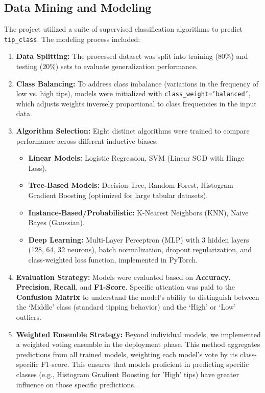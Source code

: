 \documentclass[11pt]{article}
\begin{document}
\subsection{Data Mining and Modeling}
The project utilized a suite of supervised classification algorithms to predict \texttt{tip\_class}. The modeling process included:

\begin{enumerate}
    \item \textbf{Data Splitting:} The processed dataset was split into training (80\%) and testing (20\%) sets to evaluate generalization performance.

    \item \textbf{Class Balancing:} To address class imbalance (variations in the frequency of low vs. high tips), models were initialized with \texttt{class\_weight='balanced'}, which adjusts weights inversely proportional to class frequencies in the input data.

    \item \textbf{Algorithm Selection:} Eight distinct algorithms were trained to compare performance across different inductive biases:
    \begin{itemize}
        \item \textbf{Linear Models:} Logistic Regression, SVM (Linear SGD with Hinge Loss).
        \item \textbf{Tree-Based Models:} Decision Tree, Random Forest, Histogram Gradient Boosting (optimized for large tabular datasets).
        \item \textbf{Instance-Based/Probabilistic:} K-Nearest Neighbors (KNN), Naive Bayes (Gaussian).
        \item \textbf{Deep Learning:} Multi-Layer Perceptron (MLP) with 3 hidden layers (128, 64, 32 neurons), batch normalization, dropout regularization, and class-weighted loss function, implemented in PyTorch.
    \end{itemize}

    \item \textbf{Evaluation Strategy:} Models were evaluated based on \textbf{Accuracy}, \textbf{Precision}, \textbf{Recall}, and \textbf{F1-Score}. Specific attention was paid to the \textbf{Confusion Matrix} to understand the model's ability to distinguish between the `Middle' class (standard tipping behavior) and the `High' or `Low' outliers.
    \item \textbf{Weighted Ensemble Strategy:} Beyond individual models, we implemented a weighted voting ensemble in the deployment phase. This method aggregates predictions from all trained models, weighting each model's vote by its class-specific F1-score. This ensures that models proficient in predicting specific classes (e.g., Histogram Gradient Boosting for 'High' tips) have greater influence on those specific predictions.
\end{enumerate}
\end{document}
